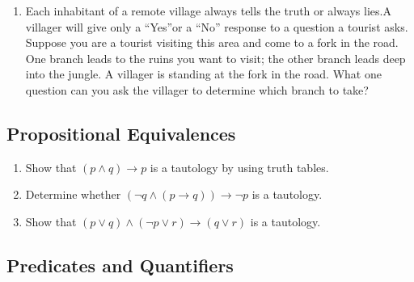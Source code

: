 \documentclass{sig-alternate-05-2015}
\begin{document}
\begin{enumerate}
\item Each inhabitant of a remote village always tells the truth
or always lies.A villager will give only a \textquotedblleft Yes\textquotedblright or a \textquotedblleft No\textquotedblright
response to a question a tourist asks. Suppose you are a
tourist visiting this area and come to a fork in the road.
One branch leads to the ruins you want to visit; the other
branch leads deep into the jungle. A villager is standing
at the fork in the road. What one question can you ask the
villager to determine which branch to take?
\end{enumerate}

\subsection{Propositional Equivalences}

\begin{enumerate}
\item Show that $(p \wedge q) \rightarrow p$ is a tautology
by using truth tables.

\item Determine whether $(\neg q \wedge (p \rightarrow q)) \rightarrow \neg p$ is a tautology.

\item Show that $(p \vee q) \wedge (\neg p \vee r) \rightarrow (q \vee r)$ is a tautology.

\end{enumerate}

\subsection{Predicates and Quantifiers}
\end{document}
